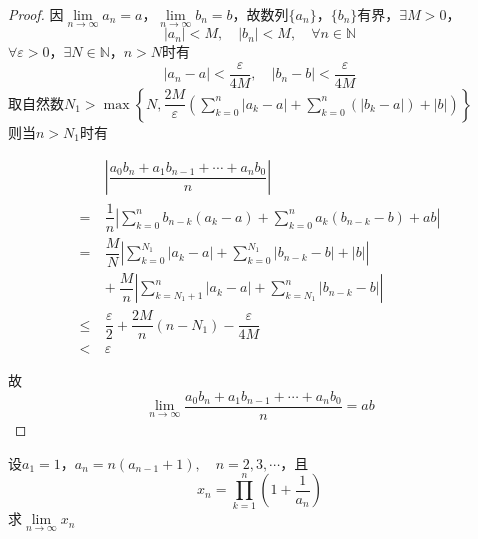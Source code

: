 \begin{proof}

    因$\lim\limits_{n \to \infty}{a_n} = a$，$\lim\limits_{n \to \infty}{b_n} = b $，故数列$\{a_n\}$，$\{b_n\}$有界，$\exists M > 0$，
    \[|a_n| < M, \quad |b_n| < M, \quad \forall n \in \mathbb{N}\]
    $\forall \varepsilon > 0 $，$\exists N \in \mathbb{N}$，$n > N$时有
    \[|a_n - a| < \dfrac{\varepsilon}{4M}, \quad |b_n - b| < \dfrac{\varepsilon}{4M}\]
    取自然数$N_1 > \max\left\{ N, \dfrac{2M}{\varepsilon}\left( \sum\limits_{k = 0}^{n}{|a_k - a|} + \sum\limits_{k = 0}^{n}{(|b_k - a|)} + |b| \right) \right\}$ \\
    则当$n > N_1$时有

    \begin{align*}
        & \left| \dfrac{a_0b_n + a_1b_{n - 1} + \cdots + a_nb_0}{n} \right| \\
        = \ & \dfrac{1}{n} \left| \sum\limits_{k = 0}^{n}{b_{n - k}(a_k - a)} + \sum\limits_{k = 0}^{n}{a_k(b_{n - k} - b)} + ab \right| \\
        = \ & \dfrac{M}{N} \left| \sum\limits_{k = 0}^{N_1}{|a_k - a|} + \sum\limits_{k = 0}^{N_1}{|b_{n - k} - b|} + |b| \right| \\
        \ & + \ \dfrac{M}{n} \left| \sum\limits_{k = N_1 + 1}^{n}{|a_k - a|} + \sum\limits_{k = N_1}^{n}{|b_{n - k} - b|} \right| \\
        \leq \ & \dfrac{\varepsilon}{2} + \dfrac{2M}{n}(n - N_1) - \dfrac{\varepsilon}{4M} \\
        < \ & \varepsilon 
    \end{align*}

    故
    \[\lim\limits_{n \to \infty}{\dfrac{a_0b_n + a_1b_{n - 1} + \cdots + a_nb_0}{n}} = ab\]
    
\end{proof}

\begin{proposition}

    设$a_1 = 1$，$a_n = n(a_{n - 1} + 1), \quad n = 2, 3, \cdots $，且
    \[x_n = \prod_{k  = 1}^{n}{\left( 1 + \dfrac{1}{a_n} \right)}\]
    求$\lim\limits_{n \to \infty}{x_n}$

\end{proposition}

